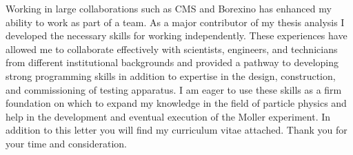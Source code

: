 \documentclass[10pt,a4paper,sans,english]{moderncv}        %
\begin{document}
Working in large collaborations such as CMS and Borexino has enhanced my ability to work as part of a team. As a major contributor of my thesis analysis I developed the necessary skills for working independently.  These experiences have allowed me to collaborate effectively with scientists, engineers, and technicians from different institutional backgrounds and provided a pathway to developing strong programming skills in addition to expertise in the design, construction, and commissioning of testing apparatus.  I am eager to use these skills as a firm foundation on which to expand my knowledge in the field of particle physics and help in the development and eventual execution of the Moller experiment.  In addition to this letter you will find my curriculum vitae attached. Thank you for your time and consideration.

\makeletterclosing
	

	
	
\end{document}
